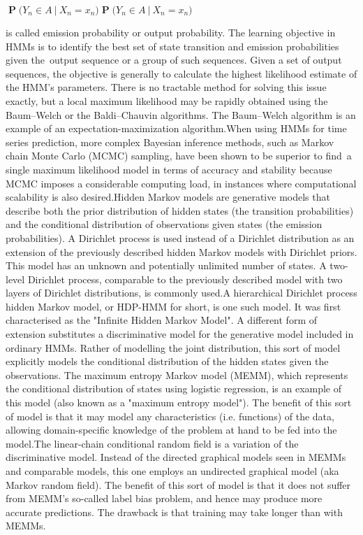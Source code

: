 {{{\({\displaystyle \operatorname {\mathbf {P} } {\bigl (}Y_{n}\in A\ {\bigl |}\ X_{n}=x_{n}{\bigr )}}{\displaystyle \operatorname {\mathbf {P} } {\bigl (}Y_{n}\in A\ {\bigl |}\ X_{n}=x_{n}{\bigr )}}\) 

is called emission probability or output probability.
The learning objective in HMMs is to identify the best set of state transition and emission probabilities given the output sequence or a group of such sequences. Given a set of output sequences, the objective is generally to calculate the highest likelihood estimate of the HMM's parameters. There is no tractable method for solving this issue exactly, but a local maximum likelihood may be rapidly obtained using the Baum–Welch or the Baldi–Chauvin algorithms. The Baum–Welch algorithm is an example of an expectation-maximization algorithm.When using HMMs for time series prediction, more complex Bayesian inference methods, such as Markov chain Monte Carlo (MCMC) sampling, have been shown to be superior to find a single maximum likelihood model in terms of accuracy and stability because MCMC imposes a considerable computing load, in instances where computational scalability is also desired.Hidden Markov models are generative models that describe both the prior distribution of hidden states (the transition probabilities) and the conditional distribution of observations given states (the emission probabilities). A Dirichlet process is used instead of a Dirichlet distribution as an extension of the previously described hidden Markov models with Dirichlet priors. This model has an unknown and potentially unlimited number of states. A two-level Dirichlet process, comparable to the previously described model with two layers of Dirichlet distributions, is commonly used.A hierarchical Dirichlet process hidden Markov model, or HDP-HMM for short, is one such model. It was first characterised as the "Infinite Hidden Markov Model". A different form of extension substitutes a discriminative model for the generative model included in ordinary HMMs. Rather of modelling the joint distribution, this sort of model explicitly models the conditional distribution of the hidden states given the observations. The maximum entropy Markov model (MEMM), which represents the conditional distribution of states using logistic regression, is an example of this model (also known as a "maximum entropy model"). The benefit of this sort of model is that it may model any characteristics (i.e. functions) of the data, allowing domain-specific knowledge of the problem at hand to be fed into the model.The linear-chain conditional random field is a variation of the discriminative model. Instead of the directed graphical models seen in MEMMs and comparable models, this one employs an undirected graphical model (aka Markov random field). The benefit of this sort of model is that it does not suffer from MEMM's so-called label bias problem, and hence may produce more accurate predictions. The drawback is that training may take longer than with MEMMs.
}}}
